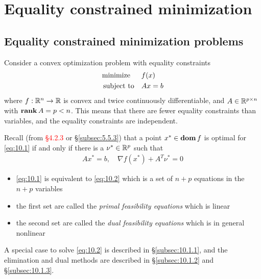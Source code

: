 \chapter{Equality constrained minimization}

\section{Equality constrained minimization problems}
Consider a convex optimization problem with equality constraints
\begin{align}
  \text{minimize\;\;}\quad& f(x)\nonumber\\
  \text{subject to}  \quad& Ax=b\label{eq:10.1}
\end{align}
where $f:\mathbb{R}^n\rightarrow\mathbb{R}$ is convex and twice continuously differentiable, and $A\in\mathbb{R}^{p\times n}$ with $\mathop{\bf rank} A=p<n$.
This means that there are fewer equality constraints than variables, and the equality constraints are independent.\par
Recall (from \textcolor{red}{\S4.2.3} or \S\ref{subsec:5.5.3}) that a point $x^\ast\in\mathop{\bf dom} f$ is optimal for \eqref{eq:10.1} if and only if there is a $\nu^\ast\in\mathbb{R}^p$ such that
\begin{align}
  Ax^\ast=b,\quad\nabla f(x^\ast)+A^T\nu^\ast=0\label{eq:10.2}
\end{align}
\begin{itemize}
  \item \eqref{eq:10.1} is equivalent to \eqref{eq:10.2} which is a set of $n+p$ equations in the $n+p$ variables
  \item the first set are called the \textit{primal feasibility equations} which is linear
  \item the second set are called the \textit{dual feasibility equations} which is in general nonlinear
\end{itemize}

A special case to solve \eqref{eq:10.2} is described in \S\ref{subsec:10.1.1}, and the elimination and dual methods are described in \S\ref{subsec:10.1.2} and \S\ref{subsec:10.1.3}.

